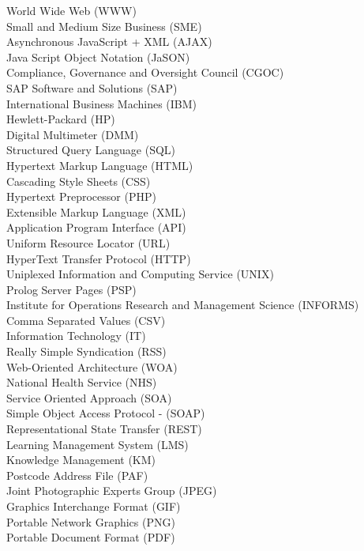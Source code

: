 \documentclass[12pt, oneside]{Thesis} %
\begin{document}
\clearpage %


{

World Wide Web (WWW)\\
Small and Medium Size Business (SME)\\
Asynchronous JavaScript + XML (AJAX)\\
Java Script Object Notation (JaSON)\\
Compliance, Governance and Oversight Council (CGOC)\\
SAP Software and Solutions (SAP)\\
International Business Machines (IBM)\\
Hewlett-Packard (HP)\\
Digital Multimeter (DMM)\\
Structured Query Language (SQL)\\
Hypertext Markup Language (HTML)\\
Cascading Style Sheets (CSS)\\
Hypertext Preprocessor (PHP)\\
Extensible Markup Language (XML)\\
Application Program Interface (API)\\
Uniform Resource Locator (URL)\\
HyperText Transfer Protocol (HTTP)\\
Uniplexed Information and Computing Service (UNIX)\\
Prolog Server Pages (PSP)\\
Institute for Operations Research and Management Science (INFORMS)\\
Comma Separated Values (CSV)\\
Information Technology (IT)\\
Really Simple Syndication (RSS)\\
Web-Oriented Architecture (WOA)\\
National Health Service (NHS)\\
Service Oriented Approach (SOA)\\
Simple Object Access Protocol - (SOAP)\\
Representational State Transfer (REST)\\
Learning Management System (LMS) \\
Knowledge Management (KM)\\
Postcode Address File (PAF)\\
Joint Photographic Experts Group (JPEG)\\
Graphics Interchange Format (GIF)\\
Portable Network Graphics (PNG)\\
Portable Document Format (PDF)\\



}
\end{document}
